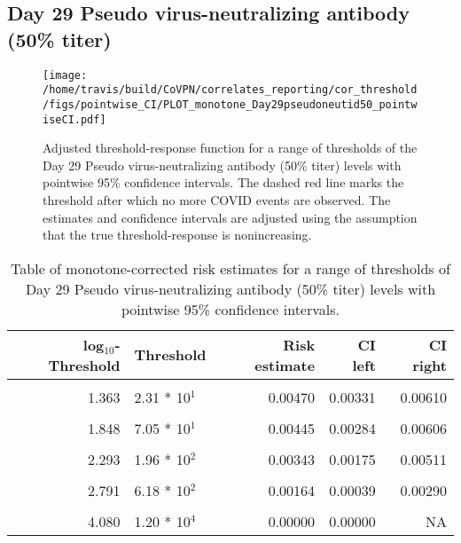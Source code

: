\documentclass[]{book}
\theoremstyle{definition}
\theoremstyle{definition}
\theoremstyle{definition}
\newcommand{\1}{\mathbbm{1}}
\begin{document}
\newpage

\newpage

\newpage

\hypertarget{day-29-pseudo-virus-neutralizing-antibody-50-titer-1}{%
\subsection{Day 29 Pseudo virus-neutralizing antibody (50\% titer)}\label{day-29-pseudo-virus-neutralizing-antibody-50-titer-1}}

\begin{figure}[H]
\centering
\texttt{[image: /home/travis/build/CoVPN/correlates\_reporting/cor\_threshold/figs/pointwise\_CI/PLOT\_monotone\_Day29pseudoneutid50\_pointwiseCI.pdf]}
\caption{Adjusted threshold-response function for a range of thresholds of the
  Day 29 Pseudo virus-neutralizing antibody (50\% titer) levels with pointwise 95\% confidence intervals. The dashed red line marks the threshold after which no more COVID events are observed. The estimates and confidence intervals are adjusted using the assumption that the true threshold-response is nonincreasing.}
\end{figure}
\begin{table}[!h]

\caption{\label{tab:unnamed-chunk-375}Table of monotone-corrected risk estimates for a range of thresholds of Day 29 Pseudo virus-neutralizing antibody (50\% titer) levels with pointwise 95\% confidence intervals.}
\centering
\begin{tabular}[t]{rlrrr}
\toprule
log$_{10}$-Threshold & Threshold & Risk estimate & CI left & CI right\\
\midrule
\cellcolor{gray!6}{0.699} & \cellcolor{gray!6}{5.00 * 10$^0$} & \cellcolor{gray!6}{0.00585} & \cellcolor{gray!6}{0.00442} & \cellcolor{gray!6}{0.00727}\\
1.363 & 2.31 * 10$^1$ & 0.00470 & 0.00331 & 0.00610\\
\cellcolor{gray!6}{1.628} & \cellcolor{gray!6}{4.25 * 10$^1$} & \cellcolor{gray!6}{0.00468} & \cellcolor{gray!6}{0.00318} & \cellcolor{gray!6}{0.00619}\\
1.848 & 7.05 * 10$^1$ & 0.00445 & 0.00284 & 0.00606\\
\cellcolor{gray!6}{2.078} & \cellcolor{gray!6}{1.20 * 10$^2$} & \cellcolor{gray!6}{0.00411} & \cellcolor{gray!6}{0.00249} & \cellcolor{gray!6}{0.00573}\\
2.293 & 1.96 * 10$^2$ & 0.00343 & 0.00175 & 0.00511\\
\cellcolor{gray!6}{2.537} & \cellcolor{gray!6}{3.44 * 10$^2$} & \cellcolor{gray!6}{0.00164} & \cellcolor{gray!6}{0.00037} & \cellcolor{gray!6}{0.00291}\\
2.791 & 6.18 * 10$^2$ & 0.00164 & 0.00039 & 0.00290\\
\cellcolor{gray!6}{3.109} & \cellcolor{gray!6}{1.29 * 10$^3$} & \cellcolor{gray!6}{0.00164} & \cellcolor{gray!6}{0.00000} & \cellcolor{gray!6}{0.00446}\\
4.080 & 1.20 * 10$^4$ & 0.00000 & 0.00000 & NA\\
\bottomrule
\end{tabular}
\end{table}
\end{document}
